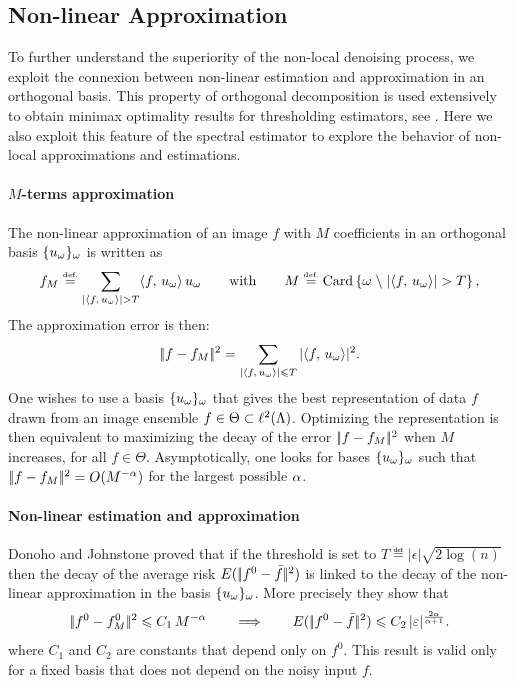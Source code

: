 \documentclass[final]{siamltex}
\newcommand{\F}{f}
\newcommand{\fz}{f^0}
\begin{document}
\subsection{Non-linear Approximation}

To further understand the superiority of the non-local denoising process, we exploit the connexion between non-linear estimation and approximation in an orthogonal basis. This property of orthogonal decomposition is used extensively to obtain minimax optimality results for thresholding estimators, see \cite{donoho-shrinkage}. Here we also exploit this feature of the spectral estimator to explore the behavior of non-local approximations and estimations. 

\paragraph{$M$-terms approximation}

The non-linear approximation of an image $f$ with $M$ coefficients in an orthogonal basis $\{u_\omega\}_\omega$ is written as
\begin{equation*}
	\label{eq-defn-nonlin-approx}
    f_M \eqdef \sum_{\abs{\dotp{f}{u_\om}}>T} \dotp{f}{u_\om} \, u_\om
    \qqwithqq
    M \eqdef \Card
    \enscond{\om}{\abs{\dotp{f}{u_\om}}>T},
\end{equation*}
The approximation error is then:
\begin{equation*}
    |\!| f - f_M |\!|^2 = \sum_{| \langle f,\,u_\omega\rangle | \leqslant T} | \langle f,\,u_\omega\rangle |^2.
\end{equation*}
One wishes to use a basis $\{u_\omega\}_\omega$ that gives the best representation of data $f$ drawn from an image ensemble $f \in \Theta \subset \ell^2(\Lambda)$. Optimizing the representation is then equivalent to maximizing the decay of the error $|\!| f - f_M |\!|^2$ when $M$ increases, for all $f \in \Theta$. Asymptotically, one looks for bases $\{u_\omega\}_\omega$ such that $|\!| f - f_M |\!|^2 = O(M^{-\alpha})$ for the largest possible $\alpha$.

\paragraph{Non-linear estimation and approximation}

Donoho and Johnstone \cite{donoho-shrinkage} proved that if the threshold is set to $T \eqdef |\epsilon|\sqrt{2\log(n)}$ then the decay of the average risk $E(\norm{\fz-\bar f}^2)$ is linked to the decay of the non-linear approximation in the basis $\{u_\omega\}_\omega$. More precisely they show that
\begin{equation}
	\label{eq-equiv-thresh-denoising}
	\norm{\fz-\fz_M}^2 \leq C_1 \, M^{-\al} \qquad\Longrightarrow\qquad
	E(\norm{\fz-\bar f}^2) \leq C_2 \, |\epsilon|^{\frac{2\al}{\al+1}}.
\end{equation}
where $C_1$ and $C_2$ are constants that depend only on $\fz$. This result is valid only for a fixed basis that does not depend on the noisy input $\F$. 
\end{document}
